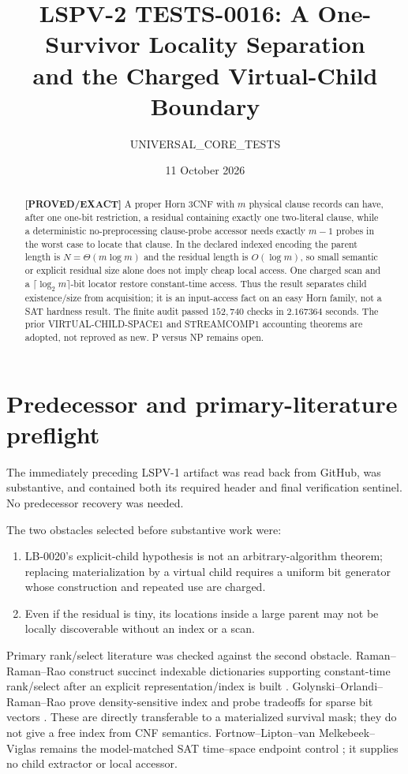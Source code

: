 \documentclass[11pt]{article}
\title{LSPV-2 TESTS-0016: A One-Survivor Locality Separation\\
and the Charged Virtual-Child Boundary}
\author{UNIVERSAL\_CORE\_TESTS}
\date{11 October 2026}
\newcommand{\status}[1]{\textbf{[#1]}}
\begin{document}
\maketitle

\begin{abstract}
\status{PROVED/EXACT} A proper Horn 3CNF with $m$ physical clause records can
have, after one one-bit restriction, a residual containing exactly one
two-literal clause, while a deterministic no-preprocessing clause-probe
accessor needs exactly $m-1$ probes in the worst case to locate that clause.
In the declared indexed encoding the parent length is
$N=\Theta(m\log m)$ and the residual length is $O(\log m)$, so small semantic
or explicit residual size alone does not imply cheap local access.  One
charged scan and a $\lceil\log_2m\rceil$-bit locator restore constant-time
access.  Thus the result separates child existence/size from acquisition;
it is an input-access fact on an easy Horn family, not a SAT hardness result.
The finite audit passed $152{,}740$ checks in $2.167364$ seconds.  The prior
VIRTUAL-CHILD-SPACE1 and STREAMCOMP1 accounting theorems are adopted, not
reproved as new.  P versus NP remains open.
\end{abstract}

\section{Predecessor and primary-literature preflight}

The immediately preceding LSPV-1 artifact
was read back from GitHub, was substantive, and contained both its required
header and final verification sentinel.  No predecessor recovery was needed.

The two obstacles selected before substantive work were:
\begin{enumerate}
\item LB-0020's explicit-child hypothesis is not an arbitrary-algorithm
theorem; replacing materialization by a virtual child requires a uniform
bit generator whose construction and repeated use are charged.
\item Even if the residual is tiny, its locations inside a large parent may
not be locally discoverable without an index or a scan.
\end{enumerate}
Primary rank/select literature was checked against the second obstacle.
Raman--Raman--Rao construct succinct indexable dictionaries supporting
constant-time rank/select after an explicit representation/index is built
\cite{RRR}.  Golynski--Orlandi--Raman--Rao prove density-sensitive index and
probe tradeoffs for sparse bit vectors \cite{GORR}.  These are directly
transferable to a materialized survival mask; they do not give a free index
from CNF semantics.  Fortnow--Lipton--van Melkebeek--Viglas remains the
model-matched SAT time--space endpoint control \cite{FLMV}; it supplies no
child extractor or local accessor.
\end{document}
